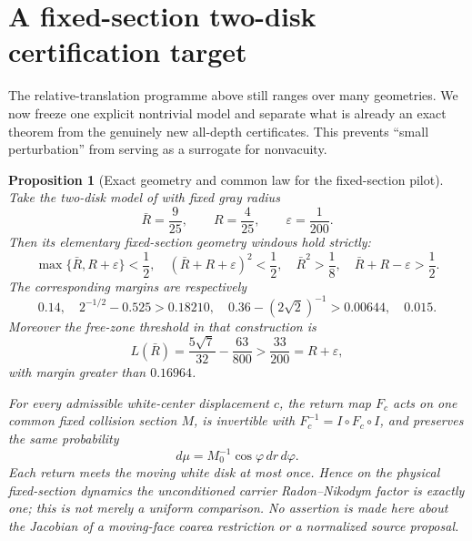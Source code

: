 \documentclass[11pt]{article}
\newtheorem{proposition}[theorem]{Proposition}
\begin{document}
\section{A fixed-section two-disk certification target}

The relative-translation programme above still ranges over many geometries.
We now freeze one explicit nontrivial model and separate what is already an
exact theorem from the genuinely new all-depth certificates.  This prevents
``small perturbation'' from serving as a surrogate for nonvacuity.

\begin{proposition}[Exact geometry and common law for the fixed-section pilot]
\label{prop:fixed-section-exact-geometry}
Take the two-disk model of \cite{StenlundRandom} with fixed gray radius
\begin{equation}
 \bar R=\frac9{25},\qquad R=\frac4{25},\qquad
 \varepsilon=\frac1{200}.
\label{eq:fixed-section-rational-data}
\end{equation}
Then its elementary fixed-section geometry windows hold strictly:
\begin{equation}
\label{eq:fixed-section-geometry-windows}
 \max\{\bar R,R+\varepsilon\}<\frac12,
 \quad (\bar R+R+\varepsilon)^2<\frac12,
 \quad \bar R^2>\frac18,
 \quad \bar R+R-\varepsilon>\frac12.
\end{equation}
The corresponding margins are respectively
\begin{equation}
\label{eq:fixed-section-geometry-margins}
 0.14,\quad
 2^{-1/2}-0.525>0.18210,\quad
 0.36-(2\sqrt2)^{-1}>0.00644,\quad
 0.015.
\end{equation}
Moreover the free-zone threshold in that construction is
\begin{equation}
 L(\bar R)=\frac{5\sqrt7}{32}-\frac{63}{800}>\frac{33}{200}
 =R+\varepsilon,
\label{eq:fixed-section-free-zone}
\end{equation}
with margin greater than $0.16964$.

For every admissible white-center displacement $c$, the return map $F_c$
acts on one common fixed collision section $M$, is invertible with
$F_c^{-1}=I\circ F_c\circ I$, and preserves the same probability
\begin{equation}
 d\mu=M_0^{-1}\cos\varphi\,dr\,d\varphi.
\label{eq:fixed-section-common-law}
\end{equation}
Each return meets the moving white disk at most once.  Hence on the physical
fixed-section dynamics the unconditioned carrier Radon--Nikodym factor is
exactly one; this is not merely a uniform comparison.  No assertion is made
here about the Jacobian of a moving-face coarea restriction or a normalized
source proposal.
\end{proposition}
\end{document}
